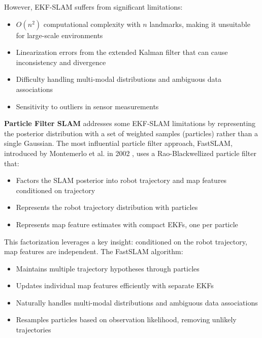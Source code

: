 \documentclass[12pt]{article}
\begin{document}
    However, EKF-SLAM suffers from significant limitations:
    \begin{itemize}
        \item $O(n^2)$ computational complexity with $n$ landmarks, making it unsuitable for large-scale environments
        \item Linearization errors from the extended Kalman filter that can cause inconsistency and divergence
        \item Difficulty handling multi-modal distributions and ambiguous data associations
        \item Sensitivity to outliers in sensor measurements
    \end{itemize}
    
    \textbf{Particle Filter SLAM} addresses some EKF-SLAM limitations by representing the posterior distribution with a set of weighted samples (particles) rather than a single Gaussian. The most influential 
    particle filter approach, FastSLAM, introduced by Montemerlo et al. in 2002 \cite{fast_slam}, uses a Rao-Blackwellized particle filter that:
    \begin{itemize}
        \item Factors the SLAM posterior into robot trajectory and map features conditioned on trajectory
        \item Represents the robot trajectory distribution with particles
        \item Represents map feature estimates with compact EKFs, one per particle
    \end{itemize}
    
    This factorization leverages a key insight: conditioned on the robot trajectory, map features are independent. The FastSLAM algorithm:
    \begin{itemize}
        \item Maintains multiple trajectory hypotheses through particles
        \item Updates individual map features efficiently with separate EKFs
        \item Naturally handles multi-modal distributions and ambiguous data associations
        \item Resamples particles based on observation likelihood, removing unlikely trajectories
    \end{itemize}
\end{document}
